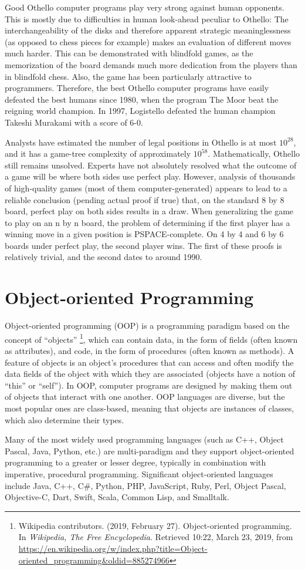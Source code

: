 \documentclass[a4paper]{report}
\begin{document}
Good Othello computer programs play very strong against human opponents. This is mostly due to difficulties in human look-ahead peculiar to Othello: The interchangeability of the disks and therefore apparent strategic meaninglessness (as opposed to chess pieces for example) makes an evaluation of different moves much harder. This can be demonstrated with blindfold games, as the memorization of the board demands much more dedication from the players than in blindfold chess. Also, the game has been particularly attractive to programmers. Therefore, the best Othello computer programs have easily defeated the best humans since 1980, when the program The Moor beat the reigning world champion. In 1997, Logistello defeated the human champion Takeshi Murakami with a score of 6-0. 
\par
Analysts have estimated the number of legal positions in Othello is at most $10^28$, and it has a game-tree complexity of approximately $10^58$. Mathematically, Othello still remains unsolved. Experts have not absolutely resolved what the outcome of a game will be where both sides use perfect play. However, analysis of thousands of high-quality games (most of them computer-generated) appears to lead to a reliable conclusion (pending actual proof if true) that, on the standard 8 by 8 board, perfect play on both sides results in a draw. When generalizing the game to play on an n by n board, the problem of determining if the first player has a winning move in a given position is PSPACE-complete. On 4 by 4 and 6 by 6 boards under perfect play, the second player wins. The first of these proofs is relatively trivial, and the second dates to around 1990. 

\section{Object-oriented Programming}
Object-oriented programming (OOP) is a programming paradigm based on the concept of ``objects'' \footnote{Wikipedia contributors. (2019, February 27). Object-oriented programming. In \emph{Wikipedia, The Free Encyclopedia}. Retrieved 10:22, March 23, 2019, from \url{https://en.wikipedia.org/w/index.php?title=Object-oriented_programming&oldid=885274966}}, which can contain data, in the form of fields (often known as attributes), and code, in the form of procedures (often known as methods). A feature of objects is an object's procedures that can access and often modify the data fields of the object with which they are associated (objects have a notion of ``this'' or ``self''). In OOP, computer programs are designed by making them out of objects that interact with one another. OOP languages are diverse, but the most popular ones are class-based, meaning that objects are instances of classes, which also determine their types. 
\par
Many of the most widely used programming languages (such as C++, Object Pascal, Java, Python, etc.) are multi-paradigm and they support object-oriented programming to a greater or lesser degree, typically in combination with imperative, procedural programming. Significant object-oriented languages include Java, C++, C\#, Python, PHP, JavaScript, Ruby, Perl, Object Pascal, Objective-C, Dart, Swift, Scala, Common Lisp, and Smalltalk. 
\end{document}
